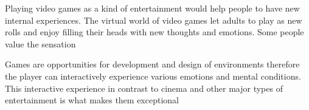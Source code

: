 
Playing video games as a kind of entertainment would help people to have new internal 
experiences. The virtual world of video games let adults to play as new rolls and enjoy filling 
their heads with new thoughts and emotions. Some people value 
the sensation

Games are opportunities for development and design of environments therefore 
the player can interactively experience various emotions and mental conditions.
This interactive experience in contrast to cinema 
and other major types of entertainment is what makes them exceptional

